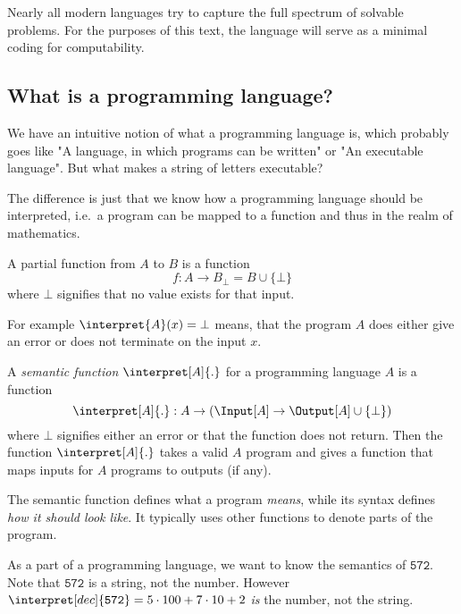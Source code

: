 Nearly all modern languages try to capture the full spectrum of solvable 
problems. For the purposes of this text, the \WHILE language will 
serve as a minimal coding for computability.

\subsection{What is a programming language?} %
\label{sub:What is a programming language}
We have an intuitive notion of what a programming language is, which probably
goes like "A language, in which programs can be written" or "An executable
language". But what makes a string of letters executable? 

The difference is just that we know how a programming language should be 
interpreted, i.e.\ a program can be mapped to a function and thus in the 
realm of mathematics.

\begin{defn}
	A partial function from $A$ to $B$ is a function 
	\[ f:A\rightarrow B_\bot = B\cup \{\bot\}\]
	where $\bot$ signifies that no value exists for that input.

	For example $\interpret{A}(x) = \bot$ means, that the program $A$ does 
	either give an error or does not terminate on the input $x$.
\end{defn}

\begin{defn}
	A \emph{semantic function} $\interpret[A]{.}$ for a programming language $A$ is a function
	\[ \interpret[A]{.}: A \rightarrow \left( \Input[A] \rightarrow 
	\Output[A]\cup \{\bot\}\right)\]
	where $\bot$ signifies either an error or that the function does not return.
	Then the function $\interpret[A]{.}$ takes a valid $A$ program and 
	gives a function that maps inputs for $A$ programs to outputs (if any).
\end{defn}
The semantic function defines what a program \emph{means}, while its syntax 
defines \emph{how it should look like}. It typically uses other functions to 
denote parts of the program. 
\begin{example}
	As a part of a programming language, we want to know the semantics of 
	$\mathtt{572}$. Note that $\mathtt{572}$ is a string, not the number. However 
	$\interpret[dec]{\mathtt{572}}=5\cdot 100+7\cdot 10+ 2$ \emph{is} the number, not the string. 
\end{example}

